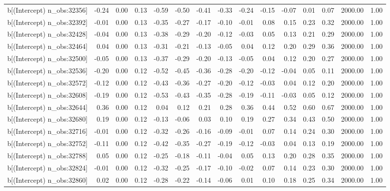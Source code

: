 \begin{table}[ht]
\begin{tabular}{rrrrrrrrrrrrrrr}
  b[(Intercept) n\_obs:32356] & -0.24 & 0.00 & 0.13 & -0.59 & -0.50 & -0.41 & -0.33 & -0.24 & -0.15 & -0.07 & 0.01 & 0.07 & 2000.00 & 1.00 \\ 
  b[(Intercept) n\_obs:32392] & -0.01 & 0.00 & 0.13 & -0.35 & -0.27 & -0.17 & -0.10 & -0.01 & 0.08 & 0.15 & 0.23 & 0.32 & 2000.00 & 1.00 \\ 
  b[(Intercept) n\_obs:32428] & -0.04 & 0.00 & 0.13 & -0.38 & -0.29 & -0.20 & -0.12 & -0.03 & 0.05 & 0.13 & 0.21 & 0.29 & 2000.00 & 1.00 \\ 
  b[(Intercept) n\_obs:32464] & 0.04 & 0.00 & 0.13 & -0.31 & -0.21 & -0.13 & -0.05 & 0.04 & 0.12 & 0.20 & 0.29 & 0.36 & 2000.00 & 1.00 \\ 
  b[(Intercept) n\_obs:32500] & -0.05 & 0.00 & 0.13 & -0.37 & -0.29 & -0.20 & -0.13 & -0.05 & 0.04 & 0.12 & 0.20 & 0.27 & 2000.00 & 1.00 \\ 
  b[(Intercept) n\_obs:32536] & -0.20 & 0.00 & 0.12 & -0.52 & -0.45 & -0.36 & -0.28 & -0.20 & -0.12 & -0.04 & 0.05 & 0.11 & 2000.00 & 1.00 \\ 
  b[(Intercept) n\_obs:32572] & -0.12 & 0.00 & 0.12 & -0.43 & -0.36 & -0.27 & -0.20 & -0.12 & -0.03 & 0.04 & 0.12 & 0.20 & 2000.00 & 1.00 \\ 
  b[(Intercept) n\_obs:32608] & -0.19 & 0.00 & 0.12 & -0.53 & -0.43 & -0.35 & -0.28 & -0.19 & -0.11 & -0.03 & 0.05 & 0.12 & 2000.00 & 1.00 \\ 
  b[(Intercept) n\_obs:32644] & 0.36 & 0.00 & 0.12 & 0.04 & 0.12 & 0.21 & 0.28 & 0.36 & 0.44 & 0.52 & 0.60 & 0.67 & 2000.00 & 1.00 \\ 
  b[(Intercept) n\_obs:32680] & 0.19 & 0.00 & 0.12 & -0.13 & -0.06 & 0.03 & 0.10 & 0.19 & 0.27 & 0.34 & 0.43 & 0.50 & 2000.00 & 1.00 \\ 
  b[(Intercept) n\_obs:32716] & -0.01 & 0.00 & 0.12 & -0.32 & -0.26 & -0.16 & -0.09 & -0.01 & 0.07 & 0.14 & 0.24 & 0.30 & 2000.00 & 1.00 \\ 
  b[(Intercept) n\_obs:32752] & -0.11 & 0.00 & 0.12 & -0.42 & -0.35 & -0.27 & -0.19 & -0.12 & -0.03 & 0.04 & 0.13 & 0.19 & 2000.00 & 1.00 \\ 
  b[(Intercept) n\_obs:32788] & 0.05 & 0.00 & 0.12 & -0.25 & -0.18 & -0.11 & -0.04 & 0.05 & 0.13 & 0.20 & 0.28 & 0.35 & 2000.00 & 1.00 \\ 
  b[(Intercept) n\_obs:32824] & -0.01 & 0.00 & 0.12 & -0.32 & -0.25 & -0.17 & -0.10 & -0.02 & 0.07 & 0.14 & 0.23 & 0.30 & 2000.00 & 1.00 \\ 
  b[(Intercept) n\_obs:32860] & 0.02 & 0.00 & 0.12 & -0.28 & -0.22 & -0.14 & -0.06 & 0.01 & 0.10 & 0.18 & 0.25 & 0.34 & 2000.00 & 1.00 \\ 

\end{tabular}
\end{table}
